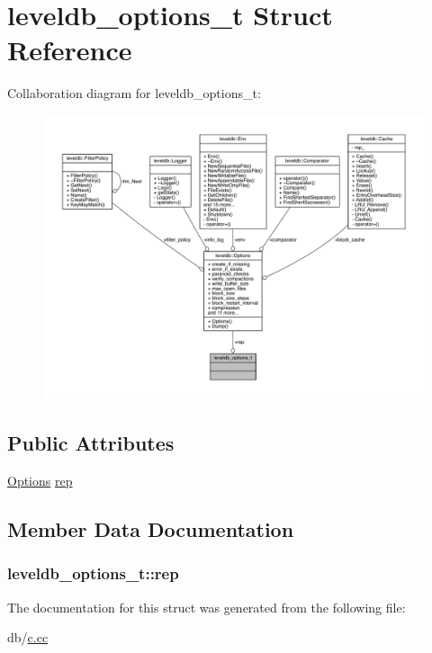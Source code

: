 \hypertarget{structleveldb__options__t}{}\section{leveldb\+\_\+options\+\_\+t Struct Reference}
\label{structleveldb__options__t}


Collaboration diagram for leveldb\+\_\+options\+\_\+t\+:
\nopagebreak
\begin{figure}[H]
\begin{center}
\leavevmode
\includegraphics[width=350pt]{structleveldb__options__t__coll__graph}
\end{center}
\end{figure}
\subsection*{Public Attributes}
\begin{DoxyCompactItemize}
\item 
\hyperlink{structleveldb_1_1_options}{Options} \hyperlink{structleveldb__options__t_a4f9a6dde987957ab489bf26c9d191df9}{rep}
\end{DoxyCompactItemize}


\subsection{Member Data Documentation}
\hypertarget{structleveldb__options__t_a4f9a6dde987957ab489bf26c9d191df9}{}
\subsubsection[{rep}]{ leveldb\+\_\+options\+\_\+t\+::rep}\label{structleveldb__options__t_a4f9a6dde987957ab489bf26c9d191df9}


The documentation for this struct was generated from the following file\+:\begin{DoxyCompactItemize}
\item 
db/\hyperlink{c_8cc}{c.\+cc}\end{DoxyCompactItemize}
